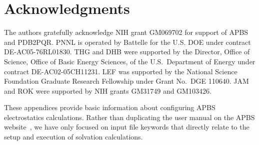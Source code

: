 \documentclass[12pt,titlepage]{article}
\begin{document}
\section*{Acknowledgments}
The authors gratefully acknowledge NIH grant GM069702 for support of APBS and PDB2PQR.
PNNL is operated by Battelle for the U.S. DOE under contract DE-AC05-76RL01830.  
THG and DHB were supported by the Director, Office of Science, Office of Basic Energy Sciences, of the U.S.~Department of Energy under contract DE-AC02-05CH11231.
LEF was supported by the National Science Foundation Graduate Research Fellowship under Grant No.~DGE 110640.
JAM and ROK were supported by NIH grants GM31749 and GM103426.

\pagebreak
\appendix

These appendices provide basic information about configuring APBS electrostatics calculations. 
Rather than duplicating the user manual on the APBS website~\cite{APBSweb}, we have only focused on input file keywords that directly relate to the setup and execution of solvation calculations.
\end{document}
